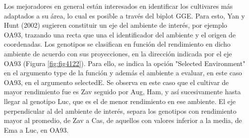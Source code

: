 Los mejoradores en general están interesados en identificar los cultivares más adaptados a su área, lo cual es posible a través del biplot GGE. Para esto, Yan y Hunt (2002) sugieren constituir un eje del ambiente de interés, por ejemplo OA93, trazando una recta que una el identificador del ambiente y el origen de coordenadas. Los genotipos se  clasifican en función del rendimiento en dicho ambiente de acuerdo con sus proyecciones, en la dirección indicada por el eje OA93 (Figura \ref{fig:fig4122}). Para ello, se indica la opción "Selected Environment" en el argumento type de la función y además el ambiente a evaluar, en este caso OA93, en el argumento selectedE. Se observa en este caso que el cultivar de mayor rendimiento fue es Zav seguido por Aug, Ham, y así sucesivamente hasta llegar al genotipo Luc, que es el de menor rendimiento en ese ambiente. El eje perpendicular al del ambiente de interés, separa los genotipos con rendimiento mayor al promedio, de Zav a Cas, de aquellos con valores inferior a la media, de Ema a Luc, en OA93.


